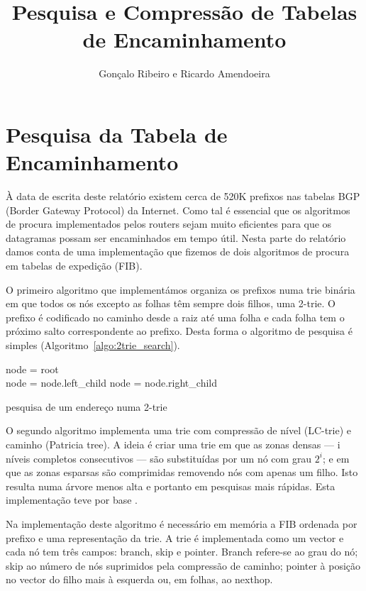 \documentclass[10pt,a4paper]{article}
\author{Gonçalo Ribeiro e Ricardo Amendoeira}
\title{Pesquisa e Compressão de Tabelas de Encaminhamento}
\begin{document}
\maketitle
\section{Pesquisa da Tabela de Encaminhamento}
	À data de escrita deste relatório existem cerca de 520K prefixos nas tabelas BGP (Border Gateway Protocol) da Internet. Como tal é essencial que os algoritmos de procura implementados pelos routers sejam muito eficientes para que os datagramas possam ser encaminhados em tempo útil. Nesta parte do relatório damos conta de uma implementação que fizemos de dois algoritmos de procura em tabelas de expedição (FIB).

	O primeiro algoritmo que implementámos organiza os prefixos numa trie binária em que todos os nós excepto as folhas têm sempre dois filhos, uma \mbox{2-trie}. O prefixo é codificado no caminho desde a raiz até uma folha e cada folha tem o próximo salto correspondente ao prefixo. Desta forma o algoritmo de pesquisa é simples (Algoritmo~\ref{algo:2trie_search}).

\begin{algorithm}
	\label{algo:2trie_search}
	node = root\\
	{
		{
			{
				node = node.left\_child
			}
			\uElse
			{
				node = node.right\_child
			}
		}
		\uElse
		{
		}
	}
		\begin{comment}
			node = root
			for each bit in address, starting at MSB
				if node != leaf
					if bit == 0
						go to left child
					else
						go to right child
				else
					return node.interface
		\end{comment}
	\caption{pesquisa de um endereço numa 2-trie}
\end{algorithm}

	O segundo algoritmo implementa uma trie com compressão de nível (\mbox{LC-trie}) e caminho (Patricia tree). A ideia é criar uma trie em que as zonas densas --- i níveis completos consecutivos --- são substituídas por um nó com grau $2^i$; e em que as zonas esparsas são comprimidas removendo nós com apenas um filho. Isto resulta numa árvore menos alta e portanto em pesquisas mais rápidas. Esta implementação teve por base \cite{SNilsson99}.

Na implementação deste algoritmo é necessário em memória a FIB ordenada por prefixo e uma representação da trie. A trie é implementada como um vector e cada nó tem três campos: branch, skip e pointer. Branch refere-se ao grau do nó; skip ao número de nós suprimidos pela compressão de caminho; pointer à posição no vector do filho mais à esquerda ou, em folhas, ao nexthop.
\end{document}

